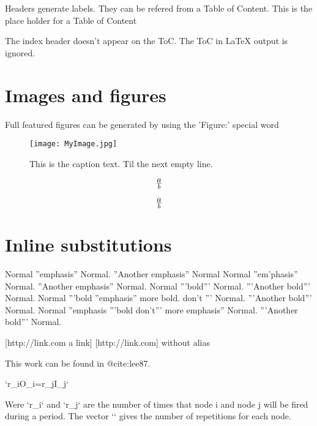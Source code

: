 Headers generate labels.
They can be refered from a Table of Content.
This is the place holder for a Table of Content


The index header doesn't appear on the ToC.
The ToC in LaTeX output is ignored.

\section{Images and figures}
\label{OtherLabel}

Full featured figures can be generated by using the 'Figure:' special word
\begin{figure*}[htbp]
\begin{center}\texttt{[image: MyImage.jpg]}\end{center}
\caption{%
This is the caption text.
Til the next empty line.
}
\label{MyLabel}
\end{figure*}


\[
a\over{b}
\]

\begin{equation}
a\over{b}
\end{equation}



\section{Inline substitutions}

Normal ''emphasis'' Normal. ''Another emphasis'' Normal
Normal ''em'phasis'' Normal. ''Another emphasis'' Normal.
Normal '''bold''' Normal. '''Another bold''' Normal.
Normal '''bold ''emphasis'' more bold. don't ''' Normal. '''Another bold''' Normal.
Normal ''emphasis '''bold don't''' more emphasis'' Normal. '''Another bold''' Normal.

[http://link.com a link]
[http://link.com] without alias

This work can be found in @cite:lee87.


`r_iO_i=r_jI_j`

Were `r_i` and `r_j` are the number of times that node i and node j will be fired during a period. The vector `` gives the number of repetitions for each node.


